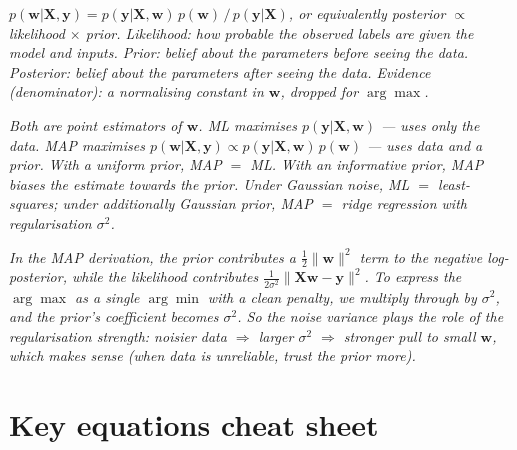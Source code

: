 \documentclass[11pt, a4paper]{article}
\begin{document}
\begin{exambox}
\textit{$p(\mathbf{w}|\mathbf{X},\mathbf{y}) = p(\mathbf{y}|\mathbf{X},\mathbf{w})\,p(\mathbf{w})\,/\,p(\mathbf{y}|\mathbf{X})$, or equivalently \emph{posterior $\propto$ likelihood $\times$ prior}. Likelihood: how probable the observed labels are given the model and inputs. Prior: belief about the parameters before seeing the data. Posterior: belief about the parameters after seeing the data. Evidence (denominator): a normalising constant in $\mathbf{w}$, dropped for $\arg\max$.}
\end{exambox}

\begin{exambox}
\textit{Both are point estimators of $\mathbf{w}$. ML maximises $p(\mathbf{y}|\mathbf{X},\mathbf{w})$ — uses only the data. MAP maximises $p(\mathbf{w}|\mathbf{X},\mathbf{y}) \propto p(\mathbf{y}|\mathbf{X},\mathbf{w})\,p(\mathbf{w})$ — uses data and a prior. With a uniform prior, MAP $=$ ML. With an informative prior, MAP biases the estimate towards the prior. Under Gaussian noise, ML $=$ least-squares; under additionally Gaussian prior, MAP $=$ ridge regression with regularisation $\sigma^2$.}
\end{exambox}

\begin{exambox}
\textit{In the MAP derivation, the prior contributes a $\frac{1}{2}\|\mathbf{w}\|^2$ term to the negative log-posterior, while the likelihood contributes $\frac{1}{2\sigma^2}\|\mathbf{X}\mathbf{w}-\mathbf{y}\|^2$. To express the $\arg\max$ as a single $\arg\min$ with a clean penalty, we multiply through by $\sigma^2$, and the prior's coefficient becomes $\sigma^2$. So the noise variance plays the role of the regularisation strength: noisier data $\Rightarrow$ larger $\sigma^2$ $\Rightarrow$ stronger pull to small $\mathbf{w}$, which makes sense (when data is unreliable, trust the prior more).}
\end{exambox}

\section*{Key equations cheat sheet}
\end{document}
